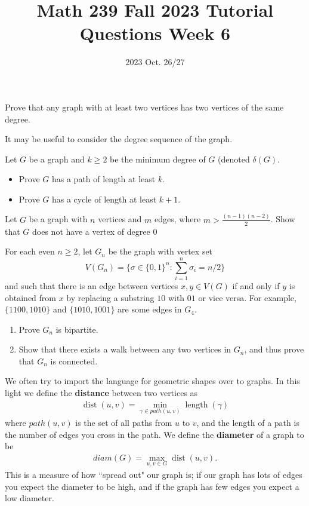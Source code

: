 \title{Math 239 Fall 2023 Tutorial Questions Week 6}

\date{2023 Oct. 26/27}
\maketitle

\begin{enumerate}
     Prove that any graph with at least two vertices has two vertices of the same degree.
    \begin{note}
        It may be useful to consider the degree sequence of the graph. 
    \end{note}
    
     Let $G$ be a graph and $k\geq 2$ be the minimum degree of $G$ (denoted $\delta(G)$.
    \begin{itemize}
        \item Prove $G$ has a path of length at least $k$.
        \item Prove $G$ has a cycle of length at least $k+1$. 
    \end{itemize}
    

    
  
    
     Let $G$ be a graph with $n$ vertices and $m$ edges, where $m > \frac{(n-1)(n-2)}{2}$. Show that $G$ does not have a vertex of degree $0$

    \newpage
    
   For each even $n\geq 2$, let $G_n$ be the graph with vertex set
    $$V(G_n) = \{\sigma \in \{0,1\}^n: \sum_{i=1}^n \sigma_i = n/2\}$$
    and such that there is an edge between vertices $x,y \in V(G)$ if and only if $y$ is obtained from $x$ by replacing a substring $10$ with $01$ or vice versa. For example, $\{1100, 1010\}$ and $\{1010, 1001\}$ are some edges in $G_4$.
    \begin{enumerate}
        \item Prove $G_n$ is bipartite.
        \item Show that there exists a walk between any two vertices in $G_n$, and thus prove that $G_n$ is connected.
    \end{enumerate}

    We often try to import the language for geometric shapes over to graphs. In this light we define the \textbf{distance} between two vertices as
    \begin{align*}
        \operatorname{dist} (u,v) = \min_{\gamma \in path(u,v)} \operatorname{length}(\gamma)
    \end{align*}
    where $path(u,v)$ is the set of all paths from $u$ to $v$, and the length of a path is the number of edges you cross in the path. We define the \textbf{diameter} of a graph to be
    \begin{align*}
        diam(G) = \max_{u,v \in G} \operatorname{dist} (u,v).
    \end{align*}
    This is a measure of how ``spread out" our graph is; if our graph has lots of edges you expect the diameter to be high, and if the graph has few edges you expect a low diameter.
    

\end{enumerate}
